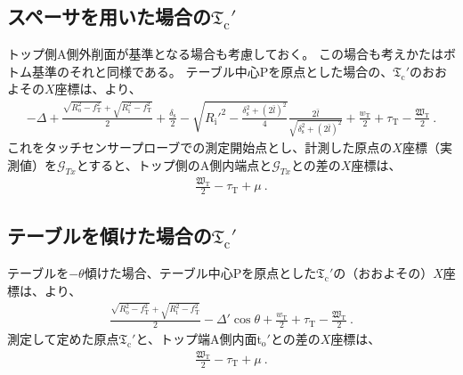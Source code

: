 \subsection[スペーサを用いた場合の\texorpdfstring{$\mathfrak T_\mathrm c'$}{Tc'}]
           {スペーサを用いた場合の$\boldsymbol{\mathfrak T_\mathrm c'}$}
トップ側A側外削面が基準となる場合も考慮しておく。
この場合も考えかたはボトム基準のそれと同様である。
テーブル中心Pを原点とした場合の、\TopOutcutCenter$\mathfrak T_\mathrm c'$のおおよその$X$座標は、より、
\begin{align*}
  -\Delta+\frac{\sqrt{R_\mathrm o^2-f_\mathrm T^2}+\sqrt{R_\mathrm i^2-f_\mathrm T^2}}2+\frac{\delta_\mathrm s}2
  -\sqrt{R_\mathrm i'^2-\frac{\delta_\mathrm s^2+(2\bar l)^2}4}\frac{2\bar l}{\sqrt{\delta_\mathrm s^2+(2\bar l)^2}}
  +\frac{w_\mathrm T}2+\tau_\mathrm T-\frac{\mathfrak W_\mathrm T}2\ .
\end{align*}
これをタッチセンサープローブでの測定開始点とし、計測した原点の$X$座標（実測値）を$\mathcal G_{Tx}$とすると、トップ側のA側内端点と$\mathcal G_{Tx}$との差の$X$座標は、
\begin{align*}
  \frac{\mathfrak W_\mathrm T}2-\tau_\mathrm T+\mu~.
\end{align*}


\subsection[テーブルを傾けた場合の\texorpdfstring{$\mathfrak T_\mathrm c'$}{Tc'}]
           {テーブルを傾けた場合の$\boldsymbol{\mathfrak T_\mathrm c'}$}
テーブルを$-\theta$傾けた場合、テーブル中心Pを原点とした\TopOutcutCenter$\mathfrak T_\mathrm c'$の（おおよその）$X$座標は、より、
\begin{align}
  \label{eq:gaisakucenterTt}
  \frac{\sqrt{R_\mathrm o^2-f_\mathrm T^2}+\sqrt{R_\mathrm i^2-f_\mathrm T^2}}2-\Delta'\cos\theta
  +\frac{w_\mathrm T}2+\tau_\mathrm T-\frac{\mathfrak W_\mathrm T}2\ .
\end{align}
測定して定めた原点$\mathfrak T_\mathrm c'$と、トップ端A側内面t$_\mathrm o'$との差の$X$座標は、
\begin{align}
  \label{eq:gaisakucenterTr}
  \frac{\mathfrak W_\mathrm T}2-\tau_\mathrm T+\mu~.
\end{align}


